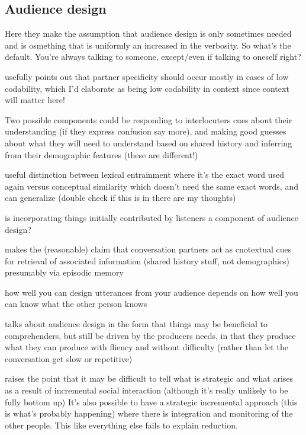 \documentclass[]{article}
\begin{document}
\subsection{Audience design}


\cite{horton2002a} Here they make the assumption that audience design is only sometimes needed and is osmething that is uniformly an increased in the verbosity. So what's the default. You're always talking to someone, except/even if talking to oneself right? 

\cite{horton2002a} usefully points out that partner specificity should occur mostly in cases of low codability, which I'd elaborate as being low codability in context since context will matter here!

Two possible components could be  responding to interlocuters cues about their understanding (if they express confusion say more), and making good guesses about what they will need to understand based on shared history and inferring from their demographic features (these are different!) 

\cite{horton2002a} useful distinction between lexical entrainment where it's the exact word used again versus conceptual similarity which doesn't need the same exact words, and can generalize (double check if this is in there are my thoughts) 

is incorporating things initially contributed by listeners a component of audience design? 

\cite{horton2005} makes the (reasonable) claim that conversation partners act as cnotextual cues for retrieval of associated information (shared history stuff, not demographics) presumably via episodic memory 

\cite{horton2005} how well you can design utterances from your audience depends on how well you can know what the other person knows

\cite{macdonald2013} talks about audience design in the form that things may be beneficial to comprehenders, but still be driven by the producers needs, in that they produce what they can produce with fliency and without difficulty (rather than let the conversation get slow or repetitive) 

\cite{rogers2013} raises the point that it may be difficult to tell what is strategic and what arises as a result of incremental social interaction (although it's really unlikely to be fully bottom up) It's also possible to have a strategic incremental approach (this is what's probably happening) where there is integration and monitoring of the other people. This like everything else fails to explain reduction. 
\end{document}
